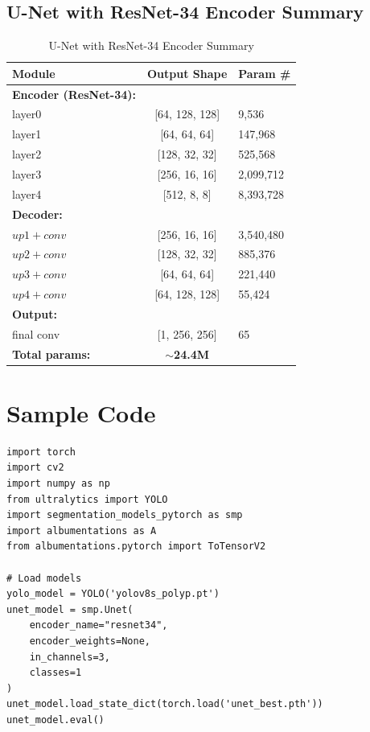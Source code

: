 \documentclass[runningheads]{llncs}
\begin{document}
\subsection{U-Net with ResNet-34 Encoder Summary}
\begin{table}[H]
\caption{U-Net with ResNet-34 Encoder Summary}
\centering
\begin{tabular}{lcl}
\toprule
\textbf{Module} & \textbf{Output Shape} & \textbf{Param \#} \\
\midrule
\textbf{Encoder (ResNet-34):} & & \\
layer0 & [64, 128, 128] & 9,536 \\
layer1 & [64, 64, 64] & 147,968 \\
layer2 & [128, 32, 32] & 525,568 \\
layer3 & [256, 16, 16] & 2,099,712 \\
layer4 & [512, 8, 8] & 8,393,728 \\
\textbf{Decoder:} & & \\
$up1+conv$ & [256, 16, 16] & 3,540,480 \\
$up2+conv$ & [128, 32, 32] & 885,376 \\
$up3+conv$ & [64, 64, 64] & 221,440 \\
$up4+conv$ & [64, 128, 128] & 55,424 \\
\textbf{Output:} & & \\
final conv & [1, 256, 256] & 65 \\
\midrule
\textbf{Total params:} & \textbf{$\sim$24.4M} & \\
\bottomrule
\end{tabular}
\end{table}

\section{Sample Code}
\label{sec:sample_code}

\begin{verbatim}
import torch
import cv2
import numpy as np
from ultralytics import YOLO
import segmentation_models_pytorch as smp
import albumentations as A
from albumentations.pytorch import ToTensorV2

# Load models
yolo_model = YOLO('yolov8s_polyp.pt')
unet_model = smp.Unet(
    encoder_name="resnet34",
    encoder_weights=None,
    in_channels=3,
    classes=1
)
unet_model.load_state_dict(torch.load('unet_best.pth'))
unet_model.eval()
\end{verbatim}
\end{document}
